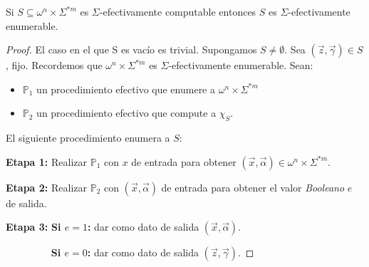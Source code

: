   \begin{lemma}
    \PN Si $S \subseteq \omega^{n} \times \Sigma^{\ast m}$ es $\Sigma$-efectivamente computable entonces $S$ es
    $\Sigma$-efectivamente enumerable.
  \end{lemma}
  \begin{proof}
    \PN El caso en el que S es vacío es trivial. Supongamos $S \neq \emptyset$. Sea $(\vec{z}, \vec{\gamma}) \in S$,
    fijo. Recordemos que $\omega^{n} \times \Sigma^{\ast m}$ es $\Sigma$-efectivamente enumerable. Sean:

    \begin{itemize}
      \item $\mathbb{P}_{1}$ un procedimiento efectivo que enumere a $\omega^{n} \times \Sigma^{\ast m}$
      \item $\mathbb{P}_{2}$ un procedimiento efectivo que compute a $\chi_{S}$.
    \end{itemize}

    \PN El siguiente procedimiento enumera a $S$:

    \vspace{3mm}
    \textbf{Etapa 1:}
    Realizar $\mathbb{P}_{1}$ con $x$ de entrada para obtener $(\vec{x}, \vec{\alpha}) \in \omega^{n}\times
    \Sigma^{\ast m}$.

    \textbf{Etapa 2:}
    Realizar $\mathbb{P}_{2}$ con $(\vec{x}, \vec{\alpha})$ de entrada para obtener el valor \textit{Booleano} $e$ de
    salida.

    \textbf{Etapa 3:}
    \textbf{Si $e=1$:} dar como dato de salida $(\vec{x}, \vec{\alpha})$.

    $\qquad\qquad\;\;$\textbf{Si $e=0$:} dar como dato de salida $(\vec{z}, \vec{\gamma})$.
  \end{proof}

